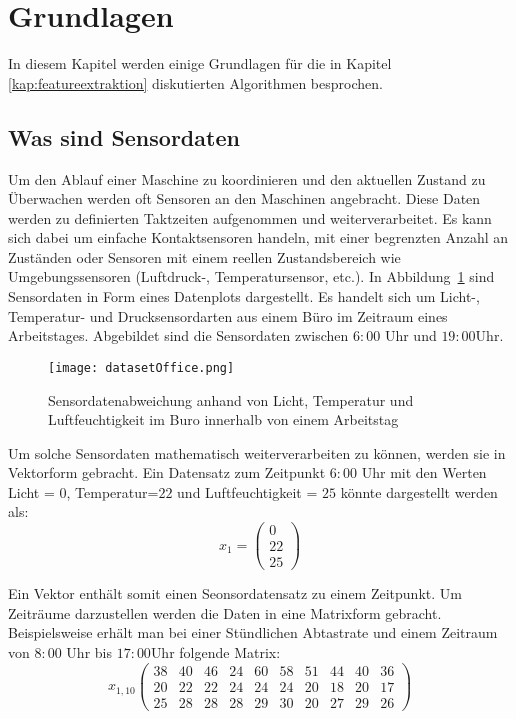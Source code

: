 \section{Grundlagen}\label{kap:grundlagen}
In diesem Kapitel werden einige Grundlagen für die in Kapitel \ref{kap:featureextraktion} diskutierten Algorithmen besprochen.
\subsection{Was sind Sensordaten}\label{kap:sensordaten}

Um den Ablauf einer Maschine zu koordinieren und den aktuellen Zustand zu Überwachen werden oft Sensoren an den Maschinen angebracht. 
Diese Daten werden zu definierten Taktzeiten aufgenommen und weiterverarbeitet. 
Es kann sich dabei um einfache Kontaktsensoren handeln, mit einer begrenzten Anzahl an Zuständen oder Sensoren mit einem reellen Zustandsbereich wie Umgebungssensoren (Luftdruck-, Temperatursensor, etc.). 
In Abbildung\ \ref{fig:datasetoffice} sind Sensordaten in Form eines Datenplots dargestellt. 
Es handelt sich um Licht-, Temperatur- und Drucksensordarten aus einem Büro im Zeitraum eines Arbeitstages. 
Abgebildet sind die Sensordaten zwischen $6:00$ Uhr und $19:00$Uhr.
\begin{figure}
    \centering
    \texttt{[image: datasetOffice.png]}
    \caption{Sensordatenabweichung anhand von Licht, Temperatur und Luftfeuchtigkeit im Buro innerhalb von einem Arbeitstag~\cite{moraru2010using}}
    \label{fig:datasetoffice}
\end{figure}

Um solche Sensordaten mathematisch weiterverarbeiten zu können, werden sie in Vektorform gebracht.
Ein Datensatz zum Zeitpunkt $6:00$ Uhr mit den Werten Licht = $0$, Temperatur=$22$ und Luftfeuchtigkeit = $25$ könnte dargestellt werden als:
\begin{equation}
    x_1 =
  \begin{pmatrix}
      0\\
      22\\
      25
  \end{pmatrix}
\end{equation}

Ein Vektor enthält somit einen Seonsordatensatz zu einem Zeitpunkt. Um Zeiträume darzustellen werden die Daten in eine Matrixform gebracht. Beispielsweise erhält man bei einer Stündlichen Abtastrate und einem Zeitraum von $8:00$ Uhr bis $17:00$Uhr folgende Matrix:
\begin{equation}
    x_{1,10}
    \begin{pmatrix}
       38 & 40 & 46 & 24 & 60 & 58 & 51 & 44 & 40 & 36\\
       20 & 22 & 22 & 24 & 24 & 24 & 20 & 18 & 20 & 17\\
       25 & 28 & 28 & 28 & 29 & 30 & 20 & 27 & 29 & 26
    \end{pmatrix}
\end{equation}

